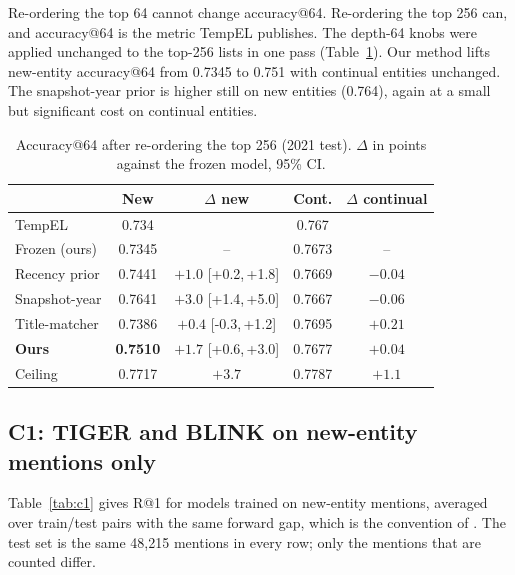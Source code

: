 \documentclass[conference]{IEEEtran}
\newcommand{\ci}[2]{[#1,\,#2]}
\begin{document}
Re-ordering the top 64 cannot change accuracy@64. Re-ordering the top 256 can, and accuracy@64 is the
metric TempEL publishes. The depth-64 knobs were applied unchanged to the top-256 lists in one pass
(Table~\ref{tab:d256}). Our method lifts new-entity accuracy@64 from 0.7345 to 0.751 with continual
entities unchanged. The snapshot-year prior is higher still on new entities (0.764), again at a small
but significant cost on continual entities.

\begin{table}[t]
\caption{Accuracy@64 after re-ordering the top 256 (2021 test). $\Delta$ in points against the frozen model, 95\% CI.}
\label{tab:d256}
\centering
\footnotesize
\begin{tabular}{lcccc}
\toprule
 & New & $\Delta$ new & Cont. & $\Delta$ continual \\
\midrule
TempEL \cite{tempel} & 0.734 & & 0.767 & \\
Frozen (ours) & 0.7345 & -- & 0.7673 & -- \\
Recency prior & 0.7441 & $+1.0$ \ci{+0.2}{+1.8} & 0.7669 & $-0.04$ \\
Snapshot-year & 0.7641 & $+3.0$ \ci{+1.4}{+5.0} & 0.7667 & $-0.06$ \\
Title-matcher & 0.7386 & $+0.4$ \ci{-0.3}{+1.2} & 0.7695 & $+0.21$ \\
\textbf{Ours} & \textbf{0.7510} & $+1.7$ \ci{+0.6}{+3.0} & 0.7677 & $+0.04$ \\
Ceiling & 0.7717 & $+3.7$ & 0.7787 & $+1.1$ \\
\bottomrule
\end{tabular}
\end{table}

\subsection{C1: TIGER and BLINK on new-entity mentions only}

Table~\ref{tab:c1} gives R@1 for models trained on new-entity mentions, averaged over train/test
pairs with the same forward gap, which is the convention of \cite{tiger,cycle}. The test set is the
same 48,215 mentions in every row; only the mentions that are counted differ.
\end{document}
